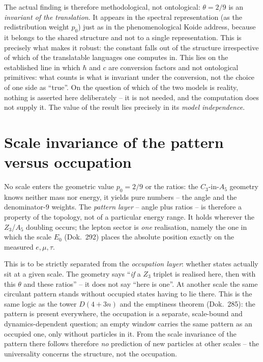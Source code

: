 The actual finding is therefore methodological, not ontological: $\theta=2/9$ is an \emph{invariant
of the translation}. It appears in the spectral representation (as the redistribution weight
$p_0$) just as in the phenomenological Koide address, because it belongs to the shared structure
and not to a single representation. This is precisely what makes it robust: the constant falls out
of the structure irrespective of which of the translatable languages one computes in. This lies on
the established line in which $\hbar$ and $c$ are conversion factors and not ontological
primitives: what counts is what is invariant under the conversion, not the choice of one side as
\enquote{true}. On the question of which of the two models is reality, nothing is asserted here
deliberately -- it is not needed, and the computation does not supply it. The value of the result
lies precisely in its \emph{model independence}.

\section{Scale invariance of the pattern versus occupation}
No scale enters the geometric value $p_0=2/9$ or the ratios: the $C_3$-in-$A_5$ geometry knows
neither mass nor energy, it yields pure numbers -- the angle and the denominator-$9$ weights.
The \emph{pattern layer} -- angle plus ratios -- is therefore a property of the topology, not of
a particular energy range. It holds wherever the $Z_3$/$A_5$ doubling occurs; the lepton sector
is \emph{one} realisation, namely the one in which the scale $E_0$ (Dok.~292) places the absolute
position exactly on the measured $e,\mu,\tau$.

This is to be strictly separated from the \emph{occupation layer}: whether states actually sit at
a given scale. The geometry says \enquote{\emph{if} a $Z_3$ triplet is realised here, then with
this $\theta$ and these ratios} -- it does not say \enquote{here is one}. At another scale the
same circulant pattern stands without occupied states having to lie there. This is the same logic
as the tower $D(4+3n)$ and the emptiness theorem (Dok.~285): the pattern is present everywhere,
the occupation is a separate, scale-bound and dynamics-dependent question; an empty window carries
the same pattern as an occupied one, only without particles in it. From the scale invariance of
the pattern there follows therefore \emph{no} prediction of new particles at other scales -- the
universality concerns the structure, not the occupation.

